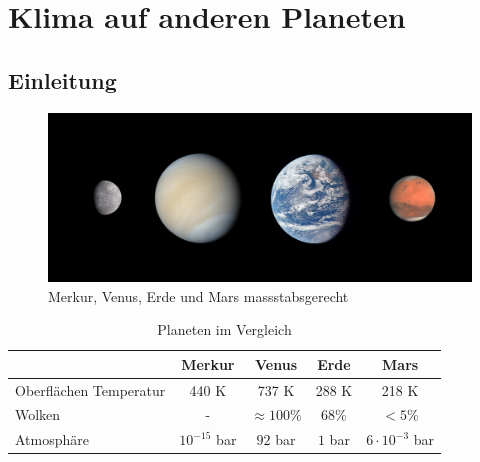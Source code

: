 %
%
%

\chapter{Klima auf anderen Planeten\label{chapter:thema}}
\begin{refsection}

\section{Einleitung}

\begin{figure}
	\centering
	\includegraphics[width=0.7\linewidth, trim={0 3cm 0 3cm},clip]{planeten/Pictures/planets2.jpg}
	\caption{Merkur, Venus, Erde und Mars massstabsgerecht}
\end{figure}

\begin{center}
\begin{table}
	\center
	\begin{tabular}{l|c c c c}
                           & Merkur         & Venus           & Erde    & Mars                  \\
  \hline
  Oberflächen Temperatur   & 440 K          & 737 K           & 288 K   & 218 K                 \\
  Wolken                   & -              & $\approx100\%$  & $68\%$  & $<5\%$                \\
  Atmosphäre               & $10^{-15}$ bar & $92$ bar        & $1$ bar & $6 \cdot 10^{-3}$ bar 
\end{tabular}
\caption{Planeten im Vergleich}
\end{table}
\end{center}


\end{refsection}
